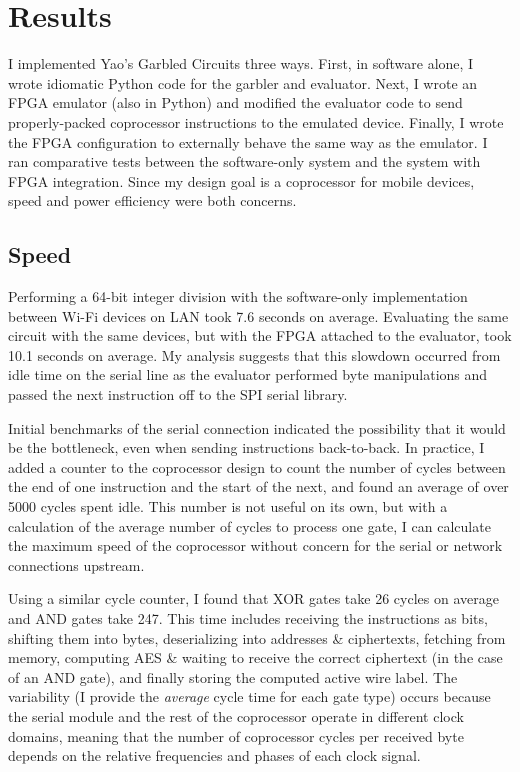 \section{Results}
I implemented Yao's Garbled Circuits three ways. First, in software alone, I wrote idiomatic Python code for the garbler and evaluator. Next, I wrote an FPGA emulator (also in Python) and modified the evaluator code to send properly-packed coprocessor instructions to the emulated device. Finally, I wrote the FPGA configuration to externally behave the same way as the emulator. I ran comparative tests between the software-only system and the system with FPGA integration. Since my design goal is a coprocessor for mobile devices, speed and power efficiency were both concerns.

\subsection{Speed}
Performing a 64-bit integer division with the software-only implementation between Wi-Fi devices on LAN took 7.6 seconds on average. Evaluating the same circuit with the same devices, but with the FPGA attached to the evaluator, took 10.1 seconds on average. My analysis suggests that this slowdown occurred from idle time on the serial line as the evaluator performed byte manipulations and passed the next instruction off to the SPI serial library.

Initial benchmarks of the serial connection indicated the possibility that it would be the bottleneck, even when sending instructions back-to-back. In practice, I added a counter to the coprocessor design to count the number of cycles between the end of one instruction and the start of the next, and found an average of over 5000 cycles spent idle. This number is not useful on its own, but with a calculation of the average number of cycles to process one gate, I can calculate the maximum speed of the coprocessor without concern for the serial or network connections upstream.

Using a similar cycle counter, I found that XOR gates take 26 cycles on average and AND gates take 247. This time includes receiving the instructions as bits, shifting them into bytes, deserializing into addresses \& ciphertexts, fetching from memory, computing AES \& waiting to receive the correct ciphertext (in the case of an AND gate), and finally storing the computed active wire label. The variability (I provide the \textit{average} cycle time for each gate type) occurs
because the serial module and the rest of the coprocessor operate in different clock domains, meaning that the number of coprocessor cycles per received byte depends on the relative frequencies and phases of each clock signal.

